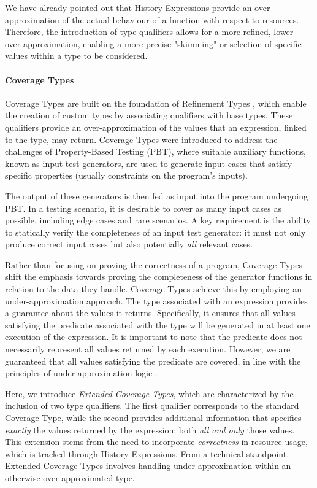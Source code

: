 We have already pointed out that History Expressions provide an over-approximation of the actual behaviour of a function with respect to resources. Therefore, the introduction of type qualifiers allows for a more refined, lower over-approximation, enabling a more precise "skimming" or selection of specific values within a type to be considered.

\paragraph{Coverage Types} 
Coverage Types \cite{coverage} are built on the foundation of Refinement Types \cite{refinement}, which enable the creation of custom types by associating qualifiers with base types. These qualifiers provide an over-approximation of the values that an expression, linked to the type, may return.
Coverage Types were introduced to address the challenges of Property-Based Testing (PBT), where suitable auxiliary functions, known as input test generators, are used to generate input cases that satisfy specific properties (usually constraints on the program's inputs). 

The output of these generators is then fed as input into the program undergoing PBT. In a testing scenario, it is desirable to cover as many input cases as possible, including edge cases and rare scenarios. A key requirement is the ability to statically verify the completeness of an input test generator: it must not only produce correct input cases but also potentially \emph{all} relevant cases.

Rather than focusing on proving the correctness of a program, Coverage Types shift the emphasis towards proving the completeness of the generator functions in relation to the data they handle. Coverage Types achieve this by employing an under-approximation approach. The type associated with an expression provides a guarantee about the values it returns. Specifically, it ensures that all values satisfying the predicate associated with the type will be generated in at least one execution of the expression. It is important to note that the predicate does not necessarily represent all values returned by each execution. However, we are guaranteed that all values satisfying the predicate are covered, in line with the principles of under-approximation logic \cite{IL1}.

Here, we introduce \emph{Extended Coverage Types}, which are characterized by the inclusion of two type qualifiers. The first qualifier corresponds to the standard Coverage Type, while the second provides additional information that specifies \emph{exactly} the values returned by the expression: both \emph{all and only} those values. This extension stems from the need to incorporate \emph{correctness} in resource usage, which is tracked through History Expressions. From a technical standpoint, Extended Coverage Types involves handling under-approximation within an otherwise over-approximated type.

